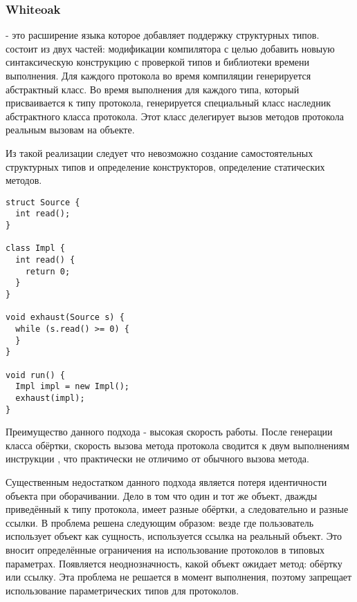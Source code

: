 \subsubsection{Whiteoak}
 - это расширение языка  которое добавляет поддержку структурных типов\cite{whiteoak}.   состоит из двух частей: модификации компилятора  с целью добавить новыую синтаксическую конструкцию с проверкой типов и библиотеки времени выполнения. Для каждого протокола во время компиляции генерируется абстрактный класс. Во время выполнения для каждого типа, который присваивается к типу протокола, генерируется специальный класс наследник абстрактного класса протокола. Этот класс делегирует вызов методов протокола реальным вызовам на объекте.

Из такой реализации следует что невозможно создание самостоятельных структурных типов и определение конструкторов, определение статических методов.

\begin{verbatim}
struct Source {
  int read();
}

class Impl {
  int read() {
    return 0;
  }
}

void exhaust(Source s) {
  while (s.read() >= 0) {
  }
}

void run() {
  Impl impl = new Impl();
  exhaust(impl);
}

\end{verbatim}

Преимущество данного подхода - высокая скорость работы. После генерации класса обёртки, скорость вызова метода протокола сводится к двум выполнениям инструкции , что практически не отличимо от обычного вызова метода.

Существенным недостатком данного подхода является потеря идентичности объекта при оборачивании. Дело в том что один и тот же объект, дважды приведённый к типу протокола, имеет разные обёртки, а следовательно и разные ссылки. В  проблема решена следующим образом: везде где пользователь использует объект как сущность, используется ссылка на реальный объект. Это вносит определённые ограничения на использование протоколов в типовых параметрах. Появляется неоднозначность, какой объект ожидает метод: обёртку или ссылку. Эта проблема не решается в момент выполнения, поэтому  запрещает использование параметрических типов для протоколов.
